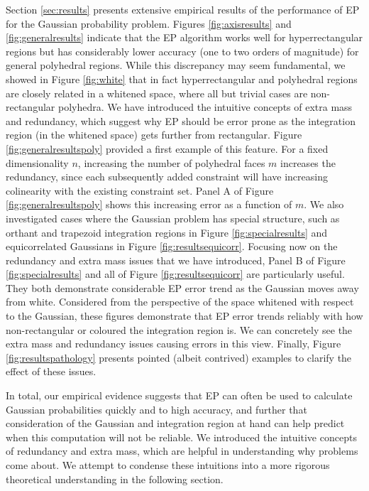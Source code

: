 \documentclass[twoside,11pt]{article}
\begin{document}
Section \ref{sec:results} presents extensive empirical results of the performance of EP for the Gaussian probability problem.  Figures \ref{fig:axisresults} and \ref{fig:generalresults} indicate that the EP algorithm works well for hyperrectangular regions but has considerably lower accuracy (one to two orders of magnitude) for general polyhedral regions.  While this discrepancy may seem fundamental, we showed in Figure \ref{fig:white} that in fact hyperrectangular and polyhedral regions are closely related in a whitened space, where all but trivial cases are non-rectangular polyhedra.  We have introduced the intuitive concepts of extra mass and redundancy, which suggest why EP should be error prone as the integration region (in the whitened space) gets further from rectangular.    Figure \ref{fig:generalresultspoly} provided a first example of this feature.  For a fixed dimensionality $n$, increasing the number of polyhedral faces $m$ increases the redundancy, since each subsequently added constraint will have increasing colinearity with the existing constraint set.  Panel A of Figure \ref{fig:generalresultspoly} shows this increasing error as a function of $m$.  We also investigated cases where the Gaussian problem has special structure, such as orthant and trapezoid integration regions in Figure \ref{fig:specialresults} and equicorrelated Gaussians in Figure \ref{fig:resultsequicorr}.  Focusing now on the redundancy and extra mass issues that we have introduced, Panel B of Figure \ref{fig:specialresults} and all of Figure \ref{fig:resultsequicorr} are particularly useful.  They both demonstrate considerable EP error trend as the Gaussian moves away from white.  Considered from the perspective of the space whitened with respect to the Gaussian, these figures demonstrate that EP error trends reliably with how non-rectangular or coloured the integration region is.  We can concretely see the extra mass and redundancy issues causing errors in this view.  Finally, Figure \ref{fig:resultspathology} presents pointed (albeit contrived) examples to clarify the effect of these issues.   

In total, our empirical evidence suggests that EP can often be used to calculate Gaussian probabilities quickly and to high accuracy, and further that consideration of the Gaussian and integration region at hand can help predict when this computation will not be reliable.  We introduced the intuitive concepts of redundancy and extra mass, which are helpful in understanding why problems come about.  We attempt to condense these intuitions into a more rigorous theoretical understanding in the following section.
\end{document}
